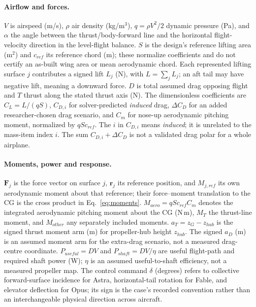 \documentclass[10pt,letterpaper]{article}
\begin{document}
\paragraph{Airflow and forces.} $V$ is airspeed (m/s), $\rho$ air density (kg/m$^3$), $q=\rho V^2/2$ dynamic pressure (Pa), and $\alpha$ the angle between the thrust/body-forward line and the horizontal flight-velocity direction in the level-flight balance. $S$ is the design's reference lifting area (m$^2$) and $c_{ref}$ its reference chord (m); these normalize coefficients and do not certify an as-built wing area or mean aerodynamic chord. Each represented lifting surface $j$ contributes a signed lift $L_j$ (N), with $L=\sum_j L_j$; an aft tail may have negative lift, meaning a downward force. $D$ is total assumed drag opposing flight and $T$ thrust along the stated thrust axis (N). The dimensionless coefficients are $C_L=L/(qS)$, $C_{D,i}$ for solver-predicted \emph{induced} drag, $\Delta C_D$ for an added researcher-chosen drag scenario, and $C_m$ for nose-up aerodynamic pitching moment, normalized by $qSc_{ref}$. The $i$ in $C_{D,i}$ means \emph{induced}; it is unrelated to the mass-item index $i$. The sum $C_{D,i}+\Delta C_D$ is not a validated drag polar for a whole airplane.

\paragraph{Moments, power and response.} $\boldsymbol F_j$ is the force vector on surface $j$, $\boldsymbol r_j$ its reference position, and $M_{j,ref}$ its own aerodynamic moment about that reference; their force--moment translation to the CG is the cross product in Eq.~\ref{eq:moments}. $M_{aero}=qSc_{ref}C_m$ denotes the integrated aerodynamic pitching moment about the CG (N\,m), $M_T$ the thrust-line moment, and $M_{other}$ any separately included moments. $a_T=z_G-z_{hub}$ is the signed thrust moment arm (m) for propeller-hub height $z_{hub}$. The signed $a_D$ (m) is an assumed moment arm for the extra-drag scenario, not a measured drag-centre coordinate. $P_{useful}=DV$ and $P_{shaft}=DV/\eta$ are useful flight-path and required shaft power (W); $\eta$ is an assumed useful-to-shaft efficiency, not a measured propeller map. The control command $\delta$ (degrees) refers to collective forward-surface incidence for Astra, horizontal-tail rotation for Fable, and elevator deflection for Opus; its sign is the case's recorded convention rather than an interchangeable physical direction across aircraft.
\end{document}
